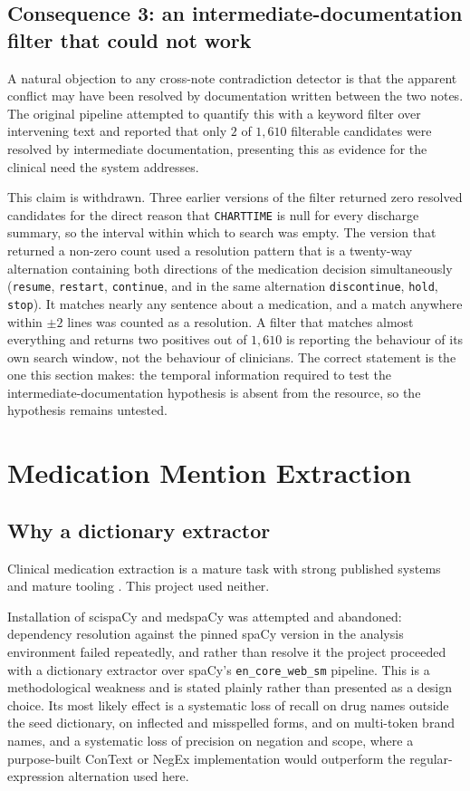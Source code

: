 \subsection{Consequence 3: an intermediate-documentation filter that could not work}

A natural objection to any cross-note contradiction detector is that the
apparent conflict may have been resolved by documentation written between the
two notes. The original pipeline attempted to quantify this with a keyword
filter over intervening text and reported that only $2$ of $1{,}610$ filterable
candidates were resolved by intermediate documentation, presenting this as
evidence for the clinical need the system addresses.

This claim is withdrawn. Three earlier versions of the filter returned zero
resolved candidates for the direct reason that \texttt{CHARTTIME} is null for
every discharge summary, so the interval within which to search was empty. The
version that returned a non-zero count used a resolution pattern that is a
twenty-way alternation containing both directions of the medication decision
simultaneously (\texttt{resume}, \texttt{restart}, \texttt{continue}, and in the
same alternation \texttt{discontinue}, \texttt{hold}, \texttt{stop}). It matches
nearly any sentence about a medication, and a match anywhere within $\pm 2$
lines was counted as a resolution. A filter that matches almost everything and
returns two positives out of $1{,}610$ is reporting the behaviour of its own
search window, not the behaviour of clinicians. The correct statement is the
one this section makes: the temporal information required to test the
intermediate-documentation hypothesis is absent from the resource, so the
hypothesis remains untested.

\section{Medication Mention Extraction}
\label{sec:extraction}

\subsection{Why a dictionary extractor}

Clinical medication extraction is a mature task with strong published systems
\citep{uzuner2010medication,henry2020n2c2} and mature tooling
\citep{neumann2019scispacy,eyre2021medspacy}. This project used neither.

Installation of scispaCy and medspaCy was attempted and abandoned: dependency
resolution against the pinned spaCy version in the analysis environment failed
repeatedly, and rather than resolve it the project proceeded with a dictionary
extractor over spaCy's \texttt{en\_core\_web\_sm} pipeline. This is a
methodological weakness and is stated plainly rather than presented as a design
choice. Its most likely effect is a systematic loss of recall on drug names
outside the seed dictionary, on inflected and misspelled forms, and on
multi-token brand names, and a systematic loss of precision on negation and
scope, where a purpose-built ConText or NegEx implementation
\citep{chapman2001negex} would outperform the regular-expression alternation
used here.

